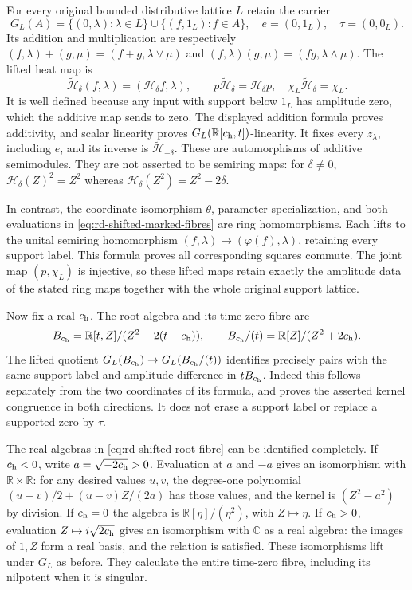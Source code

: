 For every original bounded distributive lattice $L$ retain the carrier
\[
 G_L(A)=\{(0,\lambda):\lambda\in L\}
          \cup\{(f,1_L):f\in A\},\quad
 e=(0,1_L),\quad\tau=(0,0_L).
\]
Its addition and multiplication are respectively
$(f,\lambda)+(g,\mu)=(f+g,\lambda\vee\mu)$ and
$(f,\lambda)(g,\mu)=(fg,\lambda\wedge\mu)$.
The lifted heat map is
\begin{equation}
 \widetilde{\mathscr H}_\delta(f,\lambda)
       =(\mathscr H_\delta f,\lambda),\qquad
 p\widetilde{\mathscr H}_\delta=\mathscr H_\delta p,
 \quad\chi_L\widetilde{\mathscr H}_\delta=\chi_L.
 \label{eq:rd-shifted-split-heat}
\end{equation}
It is well defined because any input with support below $1_L$ has
amplitude zero, which the additive map sends to zero. The displayed
addition formula proves additivity, and scalar linearity proves
$G_L(\mathbb R[c_{\rm h},t])$-linearity. It fixes every $z_\lambda$,
including $e$, and its inverse is
$\widetilde{\mathscr H}_{-\delta}$. These are automorphisms of
additive semimodules. They are not asserted to be semiring maps:
for $\delta\ne0$, $\mathscr H_\delta(Z)^2=Z^2$ whereas
$\mathscr H_\delta(Z^2)=Z^2-2\delta$.

In contrast, the coordinate isomorphism $\theta$, parameter
specialization, and both evaluations in
\eqref{eq:rd-shifted-marked-fibres} are ring homomorphisms. Each
lifts to the unital semiring homomorphism
$(f,\lambda)\mapsto(\varphi(f),\lambda)$, retaining every support
label. This formula proves all corresponding squares commute.
The joint map $(p,\chi_L)$ is injective, so these lifted maps retain
exactly the amplitude data of the stated ring maps together with the
whole original support lattice.

Now fix a real $c_{\rm h}$. The root algebra and its time-zero fibre
are
\begin{equation}
 B_{c_{\rm h}}=\mathbb R[t,Z]/(Z^2-2(t-c_{\rm h})),\qquad
 B_{c_{\rm h}}/(t)
   =\mathbb R[Z]/(Z^2+2c_{\rm h}).
 \label{eq:rd-shifted-root-fibre}
\end{equation}
The lifted quotient $G_L(B_{c_{\rm h}})\to
G_L(B_{c_{\rm h}}/(t))$ identifies precisely pairs with the same
support label and amplitude difference in $tB_{c_{\rm h}}$.
Indeed this follows separately from the two coordinates of its
formula, and proves the asserted kernel congruence in both
directions. It does not erase a support label or replace a supported
zero by $\tau$.

The real algebras in \eqref{eq:rd-shifted-root-fibre} can be
identified completely. If $c_{\rm h}<0$, write
$a=\sqrt{-2c_{\rm h}}>0$. Evaluation at $a$ and $-a$ gives an
isomorphism with $\mathbb R\times\mathbb R$: for any desired
values $u,v$, the degree-one polynomial
$(u+v)/2+(u-v)Z/(2a)$ has those values, and the kernel is
$(Z^2-a^2)$ by division. If $c_{\rm h}=0$ the algebra is
$\mathbb R[\eta]/(\eta^2)$, with $Z\mapsto\eta$. If
$c_{\rm h}>0$, evaluation $Z\mapsto i\sqrt{2c_{\rm h}}$ gives
an isomorphism with $\mathbb C$ as a real algebra: the images of
$1,Z$ form a real basis, and the relation is satisfied. These
isomorphisms lift under $G_L$ as before. They calculate the entire
time-zero fibre, including its nilpotent when it is singular.

